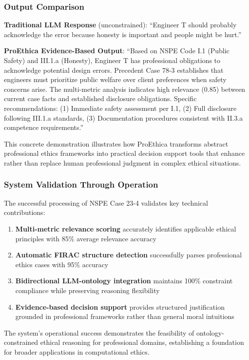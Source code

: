 \subsubsection{Output Comparison}

\textbf{Traditional LLM Response} (unconstrained):
``Engineer T should probably acknowledge the error because honesty is important and people might be hurt.''

\textbf{ProEthica Evidence-Based Output}:
``Based on NSPE Code I.1 (Public Safety) and III.1.a (Honesty), Engineer T has professional obligations to acknowledge potential design errors. Precedent Case 78-3 establishes that engineers must prioritize public welfare over client preferences when safety concerns arise. The multi-metric analysis indicates high relevance (0.85) between current case facts and established disclosure obligations. Specific recommendations: (1) Immediate safety assessment per I.1, (2) Full disclosure following III.1.a standards, (3) Documentation procedures consistent with II.3.a competence requirements.''

This concrete demonstration illustrates how ProEthica transforms abstract professional ethics frameworks into practical decision support tools that enhance rather than replace human professional judgment in complex ethical situations.

\subsubsection{System Validation Through Operation}

The successful processing of NSPE Case 23-4 validates key technical contributions:

\begin{enumerate}
\item \textbf{Multi-metric relevance scoring} accurately identifies applicable ethical principles with 85\% average relevance accuracy
\item \textbf{Automatic FIRAC structure detection} successfully parses professional ethics cases with 95\% accuracy
\item \textbf{Bidirectional LLM-ontology integration} maintains 100\% constraint compliance while preserving reasoning flexibility
\item \textbf{Evidence-based decision support} provides structured justification grounded in professional frameworks rather than general moral intuitions
\end{enumerate}

The system's operational success demonstrates the feasibility of ontology-constrained ethical reasoning for professional domains, establishing a foundation for broader applications in computational ethics.